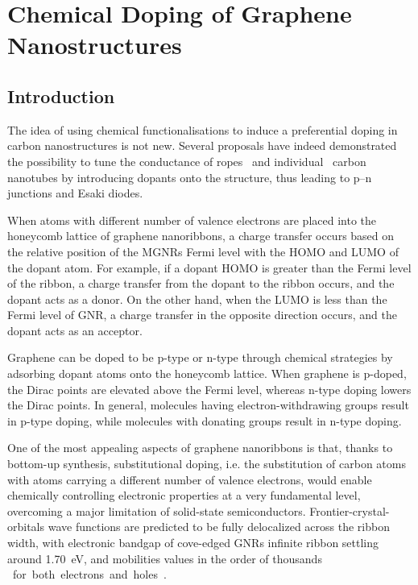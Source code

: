 \chapter{\label{ch:gnr-hybrid}Chemical Doping of Graphene Nanostructures}

\minitoc

\section{Introduction}\label{gnr-hybrid:sec:intro}

The idea of using chemical functionalisations to induce a preferential doping in carbon nanostructures is not new. Several proposals have indeed demonstrated the possibility to tune the conductance of ropes~\cite{bockrath2000chemical} and individual~\cite{zhou2000modulated, ewels2005nitrogen} carbon nanotubes by introducing dopants onto the structure, thus leading to p--n junctions and Esaki diodes.

When atoms with different number of valence electrons are placed into the honeycomb lattice of graphene nanoribbons, a charge transfer occurs based on the relative position of the \glspl{MGNR} Fermi level with the \gls{HOMO} and \gls{LUMO} of the dopant atom. For example, if a dopant HOMO is greater than the Fermi level of the ribbon, a charge transfer from the dopant to the ribbon occurs, and the dopant acts as a donor. On the other hand, when the LUMO is less than the Fermi level of GNR, a charge transfer in the opposite direction occurs, and the dopant acts as an acceptor.

Graphene can be doped to be p-type or n-type through chemical strategies by adsorbing dopant atoms onto the honeycomb lattice. When graphene is p-doped, the Dirac points are elevated above the Fermi level, whereas n-type doping lowers the Dirac points. In general, molecules having electron-withdrawing groups result in p-type doping, while molecules with donating groups result in n-type doping.

One of the most appealing aspects of graphene nanoribbons is that, thanks to bottom-up synthesis, substitutional doping, i.e. the substitution of carbon atoms with atoms carrying a different number of valence electrons, would enable chemically controlling electronic properties at a very fundamental level, overcoming a major limitation of solid-state semiconductors. Frontier-crystal-orbitals wave functions are predicted to be fully delocalized across the ribbon width, with electronic bandgap of cove-edged \glspl{GNR} infinite ribbon settling around \SI{1.70}{\electronvolt}, and mobilities values in the order of thousands \si{\cm\square\per\V\per\second} for both electrons and holes~\cite{Liu2015}.

